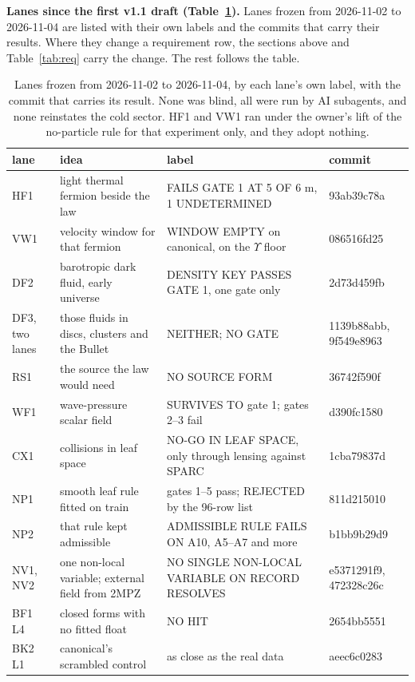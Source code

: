 \documentclass[10pt]{article}
\begin{document}
\textbf{Lanes since the first v1.1 draft (Table~\ref{tab:late}).} Lanes frozen from 2026-11-02 to 2026-11-04 are listed with their own labels and the commits that carry their results. Where they change a requirement row, the sections above and Table~\ref{tab:req} carry the change. The rest follows the table.

\begin{table}[!htbp]\centering\footnotesize
\caption{Lanes frozen from 2026-11-02 to 2026-11-04, by each lane's own label, with the commit that carries its result. None was blind, all were run by AI subagents, and none reinstates the cold sector. HF1 and VW1 ran under the owner's lift of the no-particle rule for that experiment only, and they adopt nothing.}\label{tab:late}
\begin{tabular}{>{\raggedright\arraybackslash}p{1.9cm}>{\raggedright\arraybackslash}p{4.4cm}>{\raggedright\arraybackslash}p{6.2cm}>{\raggedright\arraybackslash}p{2.2cm}}
\toprule
lane & idea & label & commit\\
\midrule
HF1 & light thermal fermion beside the law & FAILS GATE 1 AT 5 OF 6 m, 1 UNDETERMINED & 93ab39c78a\\
VW1 & velocity window for that fermion & WINDOW EMPTY on canonical, on the $\Upsilon$ floor & 086516fd25\\
DF2 & barotropic dark fluid, early universe & DENSITY KEY PASSES GATE 1, one gate only & 2d73d459fb\\
DF3, two lanes & those fluids in discs, clusters and the Bullet & NEITHER; NO GATE & 1139b88abb, 9f549e8963\\
RS1 & the source the law would need & NO SOURCE FORM & 36742f590f\\
WF1 & wave-pressure scalar field & SURVIVES TO gate 1; gates 2--3 fail & d390fc1580\\
CX1 & collisions in leaf space & NO-GO IN LEAF SPACE, only through lensing against SPARC & 1cba79837d\\
NP1 & smooth leaf rule fitted on train & gates 1--5 pass; REJECTED by the 96-row list & 811d215010\\
NP2 & that rule kept admissible & ADMISSIBLE RULE FAILS ON A10, A5--A7 and more & b1bb9b29d9\\
NV1, NV2 & one non-local variable; external field from 2MPZ & NO SINGLE NON-LOCAL VARIABLE ON RECORD RESOLVES & e5371291f9, 472328c26c\\
BF1 L4 & closed forms with no fitted float & NO HIT & 2654bb5551\\
BK2 L1 & canonical's scrambled control & as close as the real data & aeec6c0283\\

\end{tabular}
\end{table}
\end{document}

